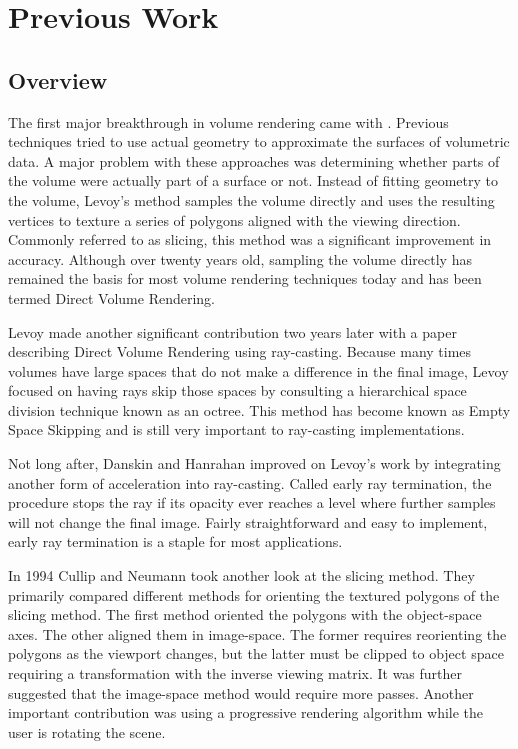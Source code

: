 \documentclass{report}
\begin{document}
\chapter{Previous Work}

\section{Overview}

The first major breakthrough in volume rendering came with \cite{Levoy88}.
Previous techniques tried to use actual geometry to approximate the surfaces of
volumetric data.  A major problem with these approaches was determining whether
parts of the volume were actually part of a surface or not.  Instead of fitting
geometry to the volume, Levoy’s method samples the volume directly and uses the
resulting vertices to texture a series of polygons aligned with the viewing
direction.  Commonly referred to as slicing, this method was a significant
improvement in accuracy.  Although over twenty years old, sampling the volume
directly has remained the basis for most volume rendering techniques today and
has been termed Direct Volume Rendering.

Levoy made another significant contribution two years later with a paper
\cite{Levoy90} describing Direct Volume Rendering using ray-casting.  Because
many times volumes have large spaces that do not make a difference in the final
image, Levoy focused on having rays skip those spaces by consulting a
hierarchical space division technique known as an octree.  This method has
become known as Empty Space Skipping and is still very important to ray-casting
implementations.

Not long after, Danskin and Hanrahan \cite{Danskin92} improved on Levoy’s work
by integrating another form of acceleration into ray-casting.  Called early ray
termination, the procedure stops the ray if its opacity ever reaches a level
where further samples will not change the final image.  Fairly straightforward
and easy to implement, early ray termination is a staple for most applications.

In 1994 Cullip and Neumann \cite{Cullip94} took another look at the slicing
method.  They primarily compared different methods for orienting the textured
polygons of the slicing method.  The first method oriented the polygons with the
object-space axes.  The other aligned them in image-space.  The former requires
reorienting the polygons as the viewport changes, but the latter must be clipped
to object space requiring a transformation with the inverse viewing matrix.  It
was further suggested that the image-space method would require more passes.
Another important contribution was using a progressive rendering algorithm while
the user is rotating the scene.
\end{document}
